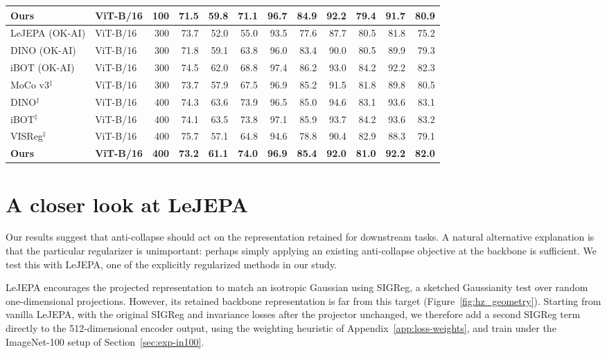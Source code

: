 \documentclass{article} %
\theoremstyle{remark}
\begin{document}
\begin{table}[h]
{\begin{tabular}{llrrrrrrrrrr}
\textbf{Ours} & \textbf{ViT-B/16} & \textbf{100} & \textbf{71.5} & \textbf{59.8} & \textbf{71.1} & \textbf{96.7} & \textbf{84.9} & \textbf{92.2} & \textbf{79.4} & \textbf{91.7} & \textbf{80.9} \\
\midrule
LeJEPA (OK-AI) & ViT-B/16 & 300 & 73.7 & 52.0 & 55.0 & 93.5 & 77.6 & 87.7 & 80.5 & 81.8 & 75.2 \\
DINO (OK-AI) & ViT-B/16 & 300 & 71.8 & 59.1 & 63.8 & 96.0 & 83.4 & 90.0 & 80.5 & 89.9 & 79.3 \\
iBOT (OK-AI) & ViT-B/16 & 300 & 74.5 & 62.0 & 68.8 & 97.4 & 86.2 & 93.0 & 84.2 & 92.2 & 82.3 \\
MoCo v3$^\ddag$ & ViT-B/16 & 300 & 73.7 & 57.9 & 67.5 & 96.9 & 85.2 & 91.5 & 81.8 & 89.8 & 80.5 \\
DINO$^\ddag$ & ViT-B/16 & 400 & 74.3 & 63.6 & 73.9 & 96.5 & 85.0 & 94.6 & 83.1 & 93.6 & 83.1 \\
iBOT$^\ddag$ & ViT-B/16 & 400 & 74.1 & 63.5 & 73.8 & 97.1 & 85.9 & 93.7 & 84.2 & 93.6 & 83.2 \\
VISReg$^\ddag$ & ViT-B/16 & 400 & 75.7 & 57.1 & 64.8 & 94.6 & 78.8 & 90.4 & 82.9 & 88.3 & 79.1 \\
\textbf{Ours} & \textbf{ViT-B/16} & \textbf{400} & \textbf{73.2} & \textbf{61.1} & \textbf{74.0} & \textbf{96.9} & \textbf{85.4} & \textbf{92.0} & \textbf{81.0} & \textbf{92.2} & \textbf{82.0} \\
\bottomrule
\end{tabular}%
}
\end{table}


\section{A closer look at LeJEPA}
\label{app:lejepa}

Our results suggest that anti-collapse should act on the representation retained for downstream tasks. A natural alternative explanation is that the particular regularizer is unimportant: perhaps simply applying an existing anti-collapse objective at the backbone is sufficient. We test this with LeJEPA, one of the explicitly regularized methods in our study.

LeJEPA encourages the projected representation to match an isotropic Gaussian using SIGReg, a sketched Gaussianity test over random one-dimensional projections. However, its retained backbone representation is far from this target (Figure~\ref{fig:hz_geometry}). Starting from vanilla LeJEPA, with the original SIGReg and invariance losses after the projector unchanged, we therefore add a second SIGReg term directly to the 512-dimensional encoder output, using the weighting heuristic of Appendix~\ref{app:loss-weights}, and train under the ImageNet-100 setup of Section~\ref{sec:exp-in100}.
\end{document}
